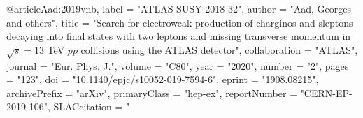 @article{Aad:2019vnb,
      label          = "ATLAS-SUSY-2018-32",
      author         = "Aad, Georges and others",
      title          = "{Search for electroweak production of charginos and
                        sleptons decaying into final states with two leptons and
                        missing transverse momentum in $\sqrt{s}=13$ TeV $pp$
                        collisions using the ATLAS detector}",
      collaboration  = "ATLAS",
      journal        = "Eur. Phys. J.",
      volume         = "C80",
      year           = "2020",
      number         = "2",
      pages          = "123",
      doi            = "10.1140/epjc/s10052-019-7594-6",
      eprint         = "1908.08215",
      archivePrefix  = "arXiv",
      primaryClass   = "hep-ex",
      reportNumber   = "CERN-EP-2019-106",
      SLACcitation   = "%
}

